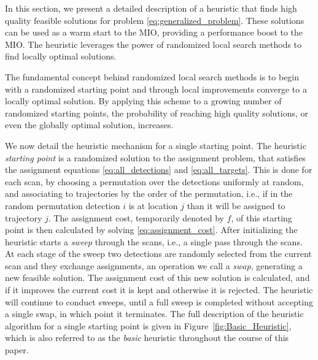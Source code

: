 In this section, we present a detailed description of a heuristic that finds high quality feasible solutions for problem \eqref{eq:generalized_problem}. These solutions can be used as a warm start to the MIO, providing a performance boost to the MIO. The heuristic leverages the power of randomized local search methods to find locally optimal solutions. 

The fundamental concept behind randomized local search methods is to begin with a randomized starting point and through local improvements converge to a locally optimal solution. By applying this scheme to a growing number of randomized starting points, the probability of reaching high quality solutions, or even the globally optimal solution, increases.

We now detail the heuristic mechanism for a single starting point. The heuristic \textit{starting point} is a randomized solution to the assignment problem, that satisfies the assignment equations \eqref{eq:all_detections} and \eqref{eq:all_targets}. This is done for each scan, by choosing a permutation over the detections uniformly at random, and associating to trajectories by the order of the permutation, i.e., if in the random permutation detection $i$ is at location $j$ than it will be assigned to trajectory $j$. The assignment cost, temporarily denoted by $f$, of this starting point is then calculated by solving \eqref{eq:assignment_cost}. After initializing the heuristic starts a \textit{sweep} through the scans, i.e., a single pass through the scans. At each stage of the sweep two detections are randomly selected from the current scan and they exchange assignments, an operation we call a \textit{swap}, generating a new feasible solution. The assignment cost of this new solution is calculated, and if it improves the current cost it is kept and otherwise it is rejected. The heuristic will continue to conduct sweeps, until a full sweep is completed without accepting a single swap, in which point it terminates. The full description of the heuristic algorithm for a single starting point is given in Figure~\ref{fig:Basic_Heuristic}, which is also referred to as the \textit{basic} heuristic throughout the course of this paper. 
